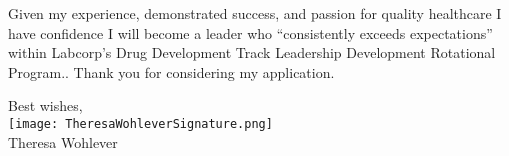 \documentclass[10pt,letterpaper]{article}
\begin{document}
Given my experience, demonstrated success, and passion for quality healthcare I have confidence I will become a leader who “consistently exceeds expectations” within Labcorp\rq{}s Drug Development Track Leadership Development Rotational Program.. Thank you for considering my application.


\hspace*{.6\linewidth} Best wishes, \\
\hspace*{.57\linewidth} \texttt{[image: TheresaWohleverSignature.png]}  {\vspace{-9pt}} \\
\hspace*{.6\linewidth}  Theresa Wohlever
\end{document}
